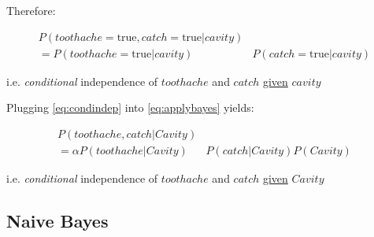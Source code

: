 \begin{frame}


Therefore:
\slidesonly{\vspace{-5mm}
}

\begin{align}
P(toothache=\text{true}, catch=\text{true} | cavity) &\\
= P(toothache=\text{true}| cavity) &P(catch=\text{true}| cavity)
\label{eq:condindep}
\end{align}

i.e. \emph{conditional} independence of $toothache$ and $catch$ \underline{given} $cavity$

\pause

Plugging \eqref{eq:condindep} into \eqref{eq:applybayes} yields:

\slidesonly{\vspace{-4mm}}

\begin{align}
P(toothache, catch | Cavity) &\\
= \alpha P(toothache| Cavity) &
P(catch| Cavity) P(Cavity)
\end{align}

i.e. \emph{conditional} independence of $toothache$ and $catch$ \underline{given} $Cavity$
\end{frame}

\subsection{Naive Bayes}

